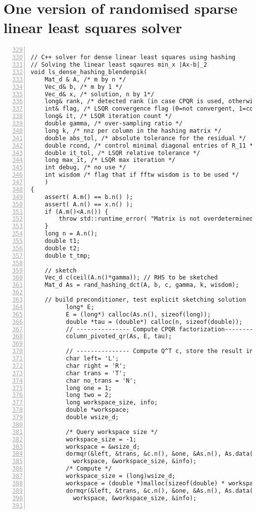 \documentclass[english,11pt]{article}
\begin{document}
\section{One version of randomised sparse linear least squares solver}

\begin{lstlisting}[numbers=left, firstnumber=329]

// C++ solver for dense linear least squares using hashing
// Solving the linear least sqaures min_x |Ax-b|_2
void ls_dense_hashing_blendenpik( 
    Mat_d & A, /* m by n */
    Vec_d& b, /* m by 1 */
    Vec_d& x, /* solution, n by 1*/
    long& rank, /* detected rank (in case CPQR is used, otherwise equals to n*/
    int& flag, /* LSQR convergence flag (0=not convergent, 1=convergent) */
    long& it, /* LSQR iteration count */
    double gamma, /* over-sampling ratio */
    long k, /* nnz per column in the hashing matrix */
    double abs_tol, /* absolute tolerance for the residual */
    double rcond, /* control minimal diagonal entries of R_11 */
    double it_tol, /* LSQR relative tolerance */
    long max_it, /* LSQR max iteration */
    int debug, /* no use */
    int wisdom /* flag that if fftw wisdom is to be used */
    )
{
    assert( A.m() == b.n() ); 
    assert( A.n() == x.n() );
    if (A.m()<A.n()) {
        throw std::runtime_error( "Matrix is not overdetermined." );
    }
    long n = A.n();
    double t1;
    double t2;
    double t_tmp;

    // sketch
    Vec_d c(ceil(A.n()*gamma)); // RHS to be sketched
    Mat_d As = rand_hashing_dct(A, b, c, gamma, k, wisdom);

    // build preconditioner, test explicit sketching solution
          long* E;
          E = (long*) calloc(As.n(), sizeof(long));
          double *tau = (double*) calloc(n, sizeof(double));
          // --------------- Compute CPQR factorization----------------//
          column_pivoted_qr(As, E, tau);

          // --------------- Compute Q^T c, store the result in c------//
          char left= 'L';
          char right = 'R';
          char trans = 'T';
          char no_trans = 'N';
          long one = 1;
          long two = 2;
          long workspace_size, info;
          double *workspace;
          double wsize_d;

          /* Query workspace size */
          workspace_size = -1;
          workspace = &wsize_d;
          dormqr(&left, &trans, &c.n(), &one, &As.n(), As.data(), &As.ld(), tau, c.data(), &c.n(), \
            workspace, &workspace_size, &info);  
          /* Compute */
          workspace_size = (long)wsize_d;
          workspace = (double *)malloc(sizeof(double) * workspace_size);
          dormqr(&left, &trans, &c.n(), &one, &As.n(), As.data(), &As.ld(), tau, c.data(), &c.n(), \
            workspace, &workspace_size, &info);  


\end{lstlisting}
\end{document}
